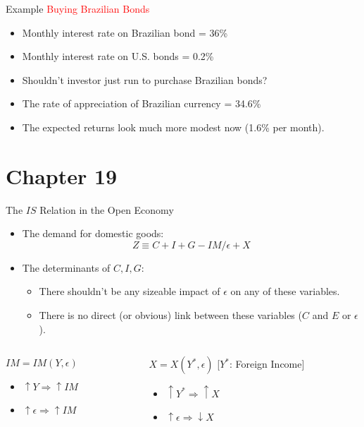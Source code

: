 \documentclass[shownotes,11pt, aspectratio=169]{beamer}
\begin{document}
\begin{frame}{Example}
\textcolor{red}{Buying Brazilian Bonds}
\begin{itemize}
\item Monthly interest rate on Brazilian bond = 36\%
\item Monthly interest rate on U.S. bonds = 0.2\%
\item Shouldn't investor just run to purchase Brazilian bonds?
\pause
\item The rate of appreciation of Brazilian currency = 34.6\%
\pause
\item The expected returns look much more modest now (1.6\% per month).
\end{itemize}
\end{frame}

\section{Chapter 19}
\begin{frame}{The $IS$ Relation in the Open Economy}
\begin{itemize}
\item The demand for domestic goods:
      \[ Z \equiv C + I + G - IM/\epsilon + X  \]
\item The determinants of $C, I, G$: 
    \begin{itemize}
    \item There shouldn't be any sizeable impact of $\epsilon$ on any of these variables.
    \item There is no direct (or obvious) link between these variables ($C$ and $E$ or $\epsilon$). 
    \end{itemize}
\end{itemize}
\begin{columns}[T] %
\begin{column}{.46\textwidth}
$IM = IM(Y, \epsilon)$
\begin{itemize}
\item $\uparrow Y \Rightarrow \uparrow IM$
\item $\uparrow \epsilon \Rightarrow \uparrow IM$
\end{itemize}
\end{column}
\hfill
\pause
\begin{column}{.44\textwidth}
$X = X(Y^{\ast}, \epsilon)$ [$Y^{\ast}$: Foreign Income]
\begin{itemize}
\item $\uparrow Y^{\ast} \Rightarrow \uparrow X$
\item $\uparrow \epsilon \Rightarrow \downarrow X$
\end{itemize}
\end{column}
\end{columns}
\end{frame}
\end{document}
